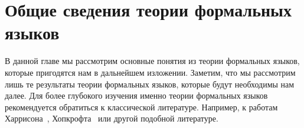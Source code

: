 \setchapterpreamble[u]{\margintoc}
\chapter{Общие сведения теории формальных языков}
\label{chpt:FormalLanguageTheoryIntro}

В данной главе мы рассмотрим основные понятия из теории формальных языков, которые пригодятся нам в дальнейшем изложении.
Заметим, что мы рассмотрим лишь те результаты теории формальных языков, которые будут необходимы нам далее.
Для более глубокого изучения именно теории формальных языков рекомендуется обратиться к классической литературе.
Например, к работам Харрисона~\cite{10.5555/578595}, Хопкрофта~\cite{Hopcroft+Ullman/79/Introduction} или другой подобной литературе.







